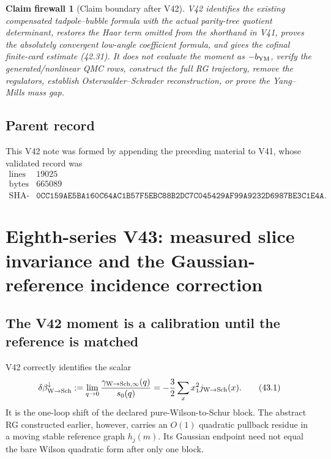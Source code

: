 \documentclass[11pt,oneside]{book}
\newtheorem{firewall}[theorem]{Claim firewall}
\theoremstyle{definition}
\theoremstyle{remark}
\begin{document}
\begin{firewall}[Claim boundary after V42]
\label{fire:e8v42-claim}
V42 identifies the existing compensated tadpole--bubble formula
with the actual parity-tree quotient determinant, restores the Haar
term omitted from the shorthand in V41, proves the absolutely
convergent low-angle coefficient formula, and gives the cofinal
finite-card estimate (42.31).  It does not evaluate the moment as
\(-b_{\rm YM}\), verify the generated/nonlinear QMC rows, construct
the full RG trajectory, remove the regulators, establish
Osterwalder--Schrader reconstruction, or prove the Yang--Mills mass
gap.
\end{firewall}

\subsection{Parent record}

This V42 note was formed by appending the preceding material to V41,
whose validated record was
\[
\begin{array}{c|c}
\text{lines}&19025\\
\text{bytes}&665089\\
\text{SHA-256}&
\texttt{0CC159AE5BA160C64AC1B57F5EBC88B2DC7C045429AF99A9232D6987BE3C1E4A}.
\end{array}
\]



\section{Eighth-series V43: measured slice invariance and the
Gaussian-reference incidence correction}
\label{sec:e8v43}

\subsection{The V42 moment is a calibration until the reference is matched}

V42 correctly identifies the scalar
\[
 \delta\beta_{\rm W\to Sch}^{\downarrow}
 :=\lim_{q\to0}\frac{\gamma_{\rm W\to Sch,\infty}(q)}{s_0(q)}
 =-\frac32\sum_xx_1^2j_{\rm W\to Sch}(x).                       \tag{43.1}
\]
It is the one-loop shift of the declared pure-Wilson-to-Schur block.
The abstract RG constructed earlier, however, carries an
\(O(1)\) quadratic pullback residue in a moving stable reference
graph \(h_j(m)\).  Its Gaussian endpoint need not equal the bare
Wilson quadratic form after only one block.
\end{document}
